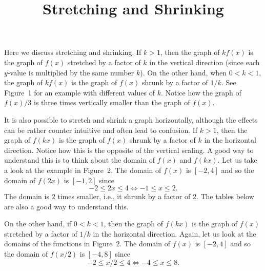 \documentclass[12pt]{article}
\begin{document}
\title{\vspace{-2em}
Stretching and Shrinking}
\date{}
\maketitle
\vspace{-6em}
\thispagestyle{fancy}
\pagestyle{fancy}

\vspace{4ex}

Here we discuss stretching and shrinking. If $k > 1$, then the graph of $kf(x)$ is the graph of $f(x)$ stretched by a factor of $k$ in the vertical direction (since each $y$-value is multiplied by the same number $k$). On the other hand, when $0 < k < 1$, the graph of $kf(x)$ is the graph of $f(x)$ shrunk by a factor of $1/k$. See Figure~1 for an example with different values of $k$. Notice how the graph of $f(x)/3$ is three times vertically smaller than the graph of $f(x)$.

It is also possible to stretch and shrink a graph horizontally, although the effects can be rather counter intuitive and often lead to confusion. If $k > 1$, then the graph of $f(kx)$ is the graph of $f(x)$ shrunk by a factor of $k$ in the horizontal direction. Notice how this is the opposite of the vertical scaling. A good way to understand this is to think about the domain of $f(x)$ and $f(kx)$. Let us take a look at the example in Figure~2. The domain of $f(x)$ is $[-2,4]$ and so the domain of $f(2x)$ is $[-1,2]$ since
\[
-2 \leq 2x \leq 4 \Longleftrightarrow -1 \leq x \leq 2.
\]
The domain is $2$ times smaller, i.e., it shrunk by a factor of $2$. The tables below are also a good way to understand this.

On the other hand, if $0 < k < 1$, then the graph of $f(kx)$ is the graph of $f(x)$ stretched by a factor of $1/k$ in the horizontal direction. Again, let us look at the domains of the functions in Figure~2. The domain of $f(x)$ is $[-2,4]$ and so the domain of $f(x/2)$ is $[-4,8]$ since
\[
-2 \leq x/2 \leq 4 \Longleftrightarrow -4 \leq x \leq 8.
\]
\end{document}
